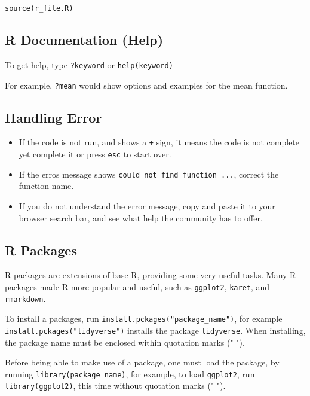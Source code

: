\documentclass[
]{book}
\providecommand{\tightlist}{%
  \setlength{\itemsep}{0pt}\setlength{\parskip}{0pt}}
\begin{document}
\texttt{source(\textquotesingle{}r\_file.R\textquotesingle{})}

\hypertarget{r-documentation-help}{%
\subsection{R Documentation (Help)}\label{r-documentation-help}}

To get help, type \texttt{?keyword} or \texttt{help(keyword)}

For example, \texttt{?mean} would show options and examples for the mean function.

\hypertarget{handling-error}{%
\subsection{Handling Error}\label{handling-error}}

\begin{itemize}
\tightlist
\item
  If the code is not run, and shows a \texttt{+} sign, it means the code is not complete yet complete it or press \texttt{esc} to start over.
\item
  If the erros message shows \texttt{could\ not\ find\ function\ ...}, correct the function name.
\item
  If you do not understand the error message, copy and paste it to your browser search bar, and see what help the community has to offer.
\end{itemize}

\hypertarget{r-packages}{%
\subsection{R Packages}\label{r-packages}}

R packages are extensions of base R, providing some very useful tasks. Many R packages made R more popular and useful, such as \texttt{ggplot2}, \texttt{karet}, and \texttt{rmarkdown}.

To install a packages, run \texttt{install.pckages("package\_name")}, for example \texttt{install.pckages("tidyverse")} installs the package \texttt{tidyverse}. When installing, the package name must be enclosed within quotation marks (" ").

Before being able to make use of a package, one must load the package, by running \texttt{library(package\_name)}, for example, to load \texttt{ggplot2}, run \texttt{library(ggplot2)}, this time without quotation marks (" ").
\end{document}
